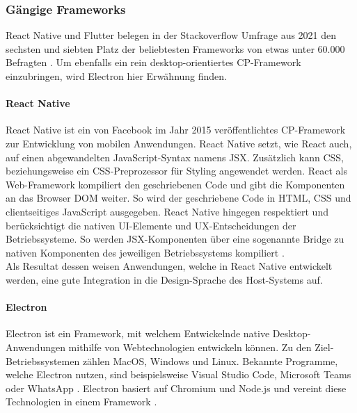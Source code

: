 \documentclass[a4paper]{scrartcl}
\begin{document}
\subsubsection{Gängige Frameworks}

React Native und Flutter belegen in der Stackoverflow Umfrage aus 2021 den sechsten und siebten Platz der beliebtesten Frameworks von etwas unter 60.000 Befragten \autocite{stackoverflow_2021}. Um ebenfalls ein rein desktop-orientiertes CP-Framework einzubringen, wird Electron hier Erwähnung finden.

\paragraph{React Native}

React Native ist ein von Facebook im Jahr 2015 veröffentlichtes CP-Framework zur Entwicklung von mobilen Anwendungen. React Native setzt, wie React auch, auf einen abgewandelten JavaScript-Syntax namens JSX. Zusätzlich kann CSS, beziehungsweise ein CSS-Preprozessor für Styling angewendet werden. React als Web-Framework kompiliert den geschriebenen Code und gibt die Komponenten an das Browser DOM weiter. So wird der geschriebene Code in HTML, CSS und clientseitiges JavaScript ausgegeben. React Native hingegen respektiert und berücksichtigt die nativen UI-Elemente und UX-Entscheidungen der Betriebssysteme. So werden JSX-Komponenten über eine sogenannte Bridge zu nativen Komponenten des jeweiligen Betriebssystems kompiliert \autocite[10f.]{React_Native_Danielsson}. \\
Als Resultat dessen weisen Anwendungen, welche in React Native entwickelt werden, eine gute Integration in die Design-Sprache des Host-Systems auf.

\paragraph{Electron}

Electron ist ein Framework, mit welchem Entwickelnde native Desktop-Anwendungen mithilfe von Webtechnologien entwickeln können. Zu den Ziel-Betriebssystemen zählen MacOS, Windows und Linux. Bekannte Programme, welche Electron nutzen, sind beispielsweise Visual Studio Code, Microsoft Teams oder WhatsApp \autocite{Electron.js}. Electron basiert auf Chromium und Node.js und vereint diese Technologien in einem Framework \autocite[Jasim 2017, zitiert nach][572]{Electron_Kredpattanakul}. \\
\end{document}
